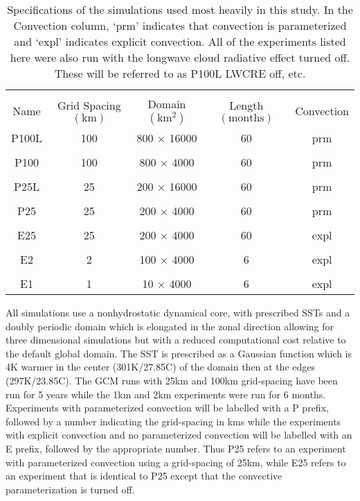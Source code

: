 \documentclass[draft]{agujournal2019}
\begin{document}
\begin{table}
\begin{center}
\caption{Specifications of the simulations used most heavily in this study.  In the Convection
column, `prm'  indicates that convection is parameterized and `expl' indicates explicit convection.
All of the experiments listed here were also run with the longwave cloud radiative effect turned off.
These will be referred to as P100L LWCRE off, etc.  }
    \begin{tabular}{*{5}{c}}
    \hline
    \hline
    \\
 Name & Grid Spacing $(\mathrm{km})$ & Domain $ (\mathrm{km^2}) $& Length $(\mathrm{months}) $ & Convection     \\ \hline
  P100L &  100          &   800 $\times$ 16000    &  60              & prm                   \\ 
    \\
  P100 &  100                & 800 $\times$ 4000     & 60            & prm                     \\  
    \\
  P25L &  25             & 200 $\times$ 16000      & 60             & prm                     \\  
    \\
  P25  &  25             & 200 $\times$ 4000      & 60             & prm                   \\  
    \\
 E25  &   25          & 200 $\times$ 4000      & 60             & expl                \\  
    \\
 E2   &   2          & 100 $\times$ 4000      & 6             & expl                   \\ 
    \\
 E1   &   1          & 10 $\times$ 4000      & 6             & expl                 \\  \hline

    \end{tabular}\par
    \label{tab:lambda}
\end{center}
\end{table}


All simulations use a nonhydrostatic dynamical core, with prescribed SSTs and a doubly periodic domain which is elongated in the zonal 
direction allowing for three dimensional simulations but with a reduced computational cost relative to the default global domain.  
The SST is prescribed as a Gaussian function which is 4K warmer in the center (301K/27.85C) of the domain then 
at the edges (297K/23.85C).  The GCM runs with 25km and 100km grid-spacing have been run for 5 years while the 
1km and 2km experiments were run for 6 months.  Experiments with parameterized convection will be labelled with a P prefix, followed
by a number indicating the grid-spacing in kms while the experiments with explicit convection and no parameterized convection will be 
labelled with an E prefix, followed by the appropriate number.  Thus P25 refers to an experiment with parameterized convection using a 
grid-spacing of 25km, while E25 refers to an experiment that is identical to P25 except that the convective parameterization is turned off.    
\end{document}
